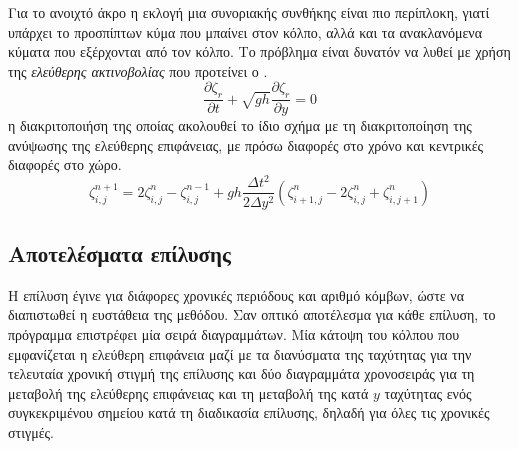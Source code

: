 Για το ανοιχτό άκρο η εκλογή μια συνοριακής συνθήκης είναι πιο περίπλοκη, γιατί υπάρχει το προσπίπτων κύμα που μπαίνει στον κόλπο, αλλά και τα ανακλανόμενα κύματα που εξέρχονται από τον κόλπο. Το πρόβλημα είναι δυνατόν να λυθεί με χρήση της \textit{ελεύθερης ακτινοβολίας} που προτείνει ο \cite{koutitas}.
\begin{equation}
    \dfrac{\partial{ζ_r}}{\partial{t}} + \sqrt{gh} \dfrac{\partial{ζ_r}}{\partial{y}} = 0 
\end{equation}
η διακριτοποιήση της οποίας ακολουθεί το ίδιο σχήμα με τη διακριτοποίηση της ανύψωσης της ελεύθερης επιφάνειας, με πρόσω διαφορές στο χρόνο και κεντρικές διαφορές στο χώρο.
\begin{equation}
    ζ_{i,j}^{n+1} = 2 ζ_{i,j}^{n} - ζ_{i,j}^{n-1} + gh\dfrac{Δt^2}{2Δy^2}\left( ζ_{i+1,j}^{n} - 2ζ_{i,j}^{n} + ζ_{i,j+1}^{n} \right)
\end{equation}

\subsection{Αποτελέσματα επίλυσης}
Η επίλυση έγινε για διάφορες χρονικές περιόδους και αριθμό κόμβων, ώστε να διαπιστωθεί η ευστάθεια της μεθόδου. Σαν οπτικό αποτέλεσμα για κάθε επίλυση, το πρόγραμμα επιστρέφει μία σειρά διαγραμμάτων. Μία κάτοψη του κόλπου που εμφανίζεται η ελεύθερη επιφάνεια μαζί με τα διανύσματα της ταχύτητας για την τελευταία χρονική στιγμή της επίλυσης και δύο διαγραμμάτα χρονοσειράς για τη μεταβολή της ελεύθερης επιφάνειας και τη μεταβολή της κατά $y$ ταχύτητας ενός συγκεκριμένου σημείου κατά τη διαδικασία επίλυσης, δηλαδή για όλες τις χρονικές στιγμές.

